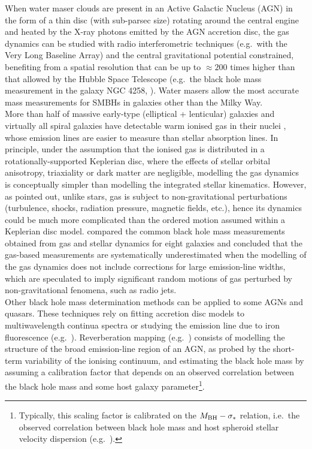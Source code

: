 When water maser clouds are present in an Active Galactic Nucleus (AGN) 
in the form of a thin disc (with sub-parsec size) rotating around the central engine 
and heated by the X-ray photons emitted by the AGN accretion disc, 
the gas dynamics can be studied with radio interferometric techniques (e.g.~with the Very Long Baseline Array)
and the central gravitational potential constrained, 
benefiting from a spatial resolution that can be up to $\approx 200$ times higher than that allowed by the Hubble Space Telescope 
(e.g.~the black hole mass measurement in the galaxy NGC 4258, \citealt{miyoshi1995}). 
Water masers allow the most accurate mass measurements for SMBHs in galaxies other than the Milky Way. \\

More than half of massive early-type (elliptical + lenticular) galaxies and virtually all spiral galaxies have 
detectable warm ionised gas in their nuclei \citep{ho1997}, 
whose emission lines are easier to measure than stellar absorption lines. 
In principle, under the assumption that the ionised gas is distributed in a rotationally-supported Keplerian disc, 
where the effects of stellar orbital anisotropy, triaxiality or dark matter are negligible, 
modelling the gas dynamics is conceptually simpler than modelling the integrated stellar kinematics. 
However, as \citet{kormendyho2013} pointed out, unlike stars, gas is subject to non-gravitational perturbations 
(turbulence, shocks, radiation pressure, magnetic fields, etc.), 
hence its dynamics could be much more complicated than the ordered motion assumed within a Keplerian disc model.
\citet{kormendyho2013} compared the common black hole mass measurements obtained from gas and stellar dynamics for eight galaxies 
and concluded that the gas-based measurements are systematically underestimated 
when the modelling of the gas dynamics does not include corrections for large emission-line widths, 
which are speculated to imply significant random motions of gas perturbed by non-gravitational fenomena, such as radio jets. \\

Other black hole mass determination methods can be applied to some AGNs and quasars. 
These techniques rely on fitting accretion disc models to multiwavelength continua spectra \citep{shields1978,malkan1983}
or studying the emission line due to iron fluorescence (e.g.~\citealt{fabian2000,reynoldsnowak2003}).
Reverberation mapping (e.g.~\citealt{peterson1993}) consists of 
modelling the structure of the broad emission-line region of an AGN, 
as probed by the short-term variability of the ionising continuum,
and estimating the black hole mass by assuming a calibration factor that depends on an observed correlation 
between the black hole mass and some host galaxy parameter\footnote{Typically, this scaling factor is calibrated 
on the $M_{\rm BH} - \sigma_*$ relation, i.e.~the observed correlation between black hole mass and host spheroid 
stellar velocity dispersion (e.g.~\citealt{ferraresemerritt2000,gebhardt2000}). }. \\

